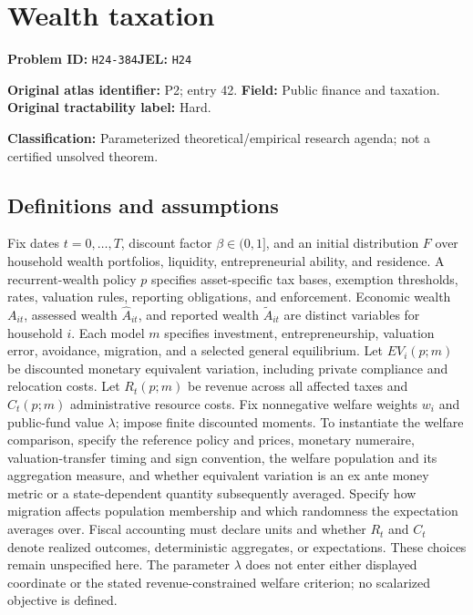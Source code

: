 \documentclass[11pt,a4paper]{article}
\begin{document}
\section*{Wealth taxation}
\textbf{Problem ID:} \texttt{H24-384}\quad \textbf{JEL:} \texttt{H24}\par
\label{problem:OP-0042}
\label{atlas:prob:P2}
\noindent\textbf{Original atlas identifier:} P2; entry 42. \textbf{Field:} Public finance and taxation. \textbf{Original tractability label:} Hard.

\noindent\textbf{Classification:} Parameterized theoretical/empirical research agenda; not a certified unsolved theorem.

\subsection*{Definitions and assumptions}
Fix dates $t=0,\ldots,T$, discount factor $\beta\in(0,1]$, and an initial distribution $F$ over household wealth portfolios, liquidity, entrepreneurial ability, and residence. A recurrent-wealth policy $p$ specifies asset-specific tax bases, exemption thresholds, rates, valuation rules, reporting obligations, and enforcement. Economic wealth $A_{it}$, assessed wealth $\widehat A_{it}$, and reported wealth $\widetilde A_{it}$ are distinct variables for household $i$. Each model $m$ specifies investment, entrepreneurship, valuation error, avoidance, migration, and a selected general equilibrium. Let $EV_i(p;m)$ be discounted monetary equivalent variation, including private compliance and relocation costs. Let $R_t(p;m)$ be revenue across all affected taxes and $C_t(p;m)$ administrative resource costs. Fix nonnegative welfare weights $w_i$ and public-fund value $\lambda$; impose finite discounted moments. To instantiate the welfare comparison, specify the reference policy and prices, monetary numeraire, valuation-transfer timing and sign convention, the welfare population and its aggregation measure, and whether equivalent variation is an ex ante money metric or a state-dependent quantity subsequently averaged. Specify how migration affects population membership and which randomness the expectation averages over. Fiscal accounting must declare units and whether $R_t$ and $C_t$ denote realized outcomes, deterministic aggregates, or expectations. These choices remain unspecified here. The parameter $\lambda$ does not enter either displayed coordinate or the stated revenue-constrained welfare criterion; no scalarized objective is defined.
\end{document}
